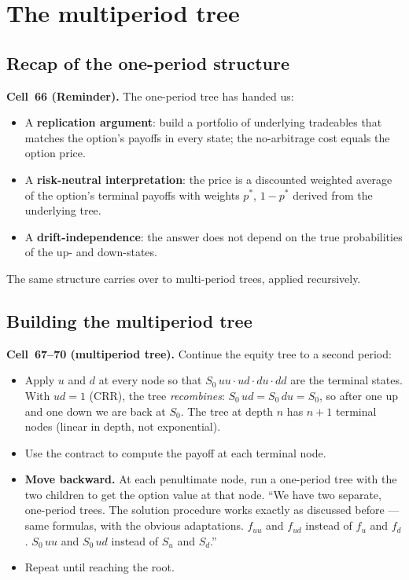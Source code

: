 \section{The multiperiod tree}\label{L8-sec:multiperiod}

\subsection{Recap of the one-period structure}\label{L8-sec:oneprecap}

\begin{keyblock}
\textbf{Cell~66 (Reminder).}
The one-period tree has handed us:
\begin{itemize}
  \item A \textbf{replication argument}: build a portfolio of
        underlying tradeables that matches the option's payoffs in
        every state; the no-arbitrage cost equals the option price.
  \item A \textbf{risk-neutral interpretation}: the price is a
        discounted weighted average of the option's terminal
        payoffs with weights $p^*$, $1 - p^*$ derived from the
        underlying tree.
  \item A \textbf{drift-independence}: the answer does not depend
        on the true probabilities of the up- and down-states.
\end{itemize}
The same structure carries over to multi-period trees, applied
recursively.
\end{keyblock}

\subsection{Building the multiperiod tree}\label{L8-sec:multitree}

\begin{keyblock}
\textbf{Cell~67--70 (multiperiod tree).}
Continue the equity tree to a second period:
\begin{itemize}
  \item Apply $u$ and $d$ at every node so that
        $S_{0}\,uu \cdot ud \cdot du \cdot dd$ are the terminal
        states. With $ud = 1$ (CRR), the tree
        \emph{recombines}: $S_0\,ud = S_0\,du = S_0$, so after one
        up and one down we are back at $S_0$. The tree at depth $n$
        has $n + 1$ terminal nodes (linear in depth, not
        exponential).
  \item Use the contract to compute the payoff at each terminal node.
  \item \textbf{Move backward.} At each penultimate node, run a
        one-period tree with the two children to get the option
        value at that node. ``We have two separate, one-period
        trees. The solution procedure works exactly as discussed
        before --- same formulas, with the obvious adaptations.
        $f_{uu}$ and $f_{ud}$ instead of $f_u$ and $f_d$. $S_0\,uu$
        and $S_0\,ud$ instead of $S_u$ and $S_d$.''
  \item Repeat until reaching the root.
\end{itemize}
\end{keyblock}

